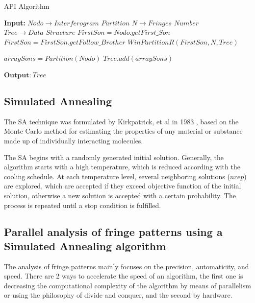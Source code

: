 \documentclass[review]{elsarticle}
\begin{document}
 \begin{algorithm}[H]
	\caption{API Algorithm}\label{IPA}
	\begin{algorithmic}[1]
		\State \textbf{Input:}
		\State $Nodo \to \textit{Interferogram Partition}$
		\State $N \to \textit{Fringes Number}$
		\State $Tree \to \textit{Data Structure}$
		\State $FirstSon = Nodo.getFirst\_Son$
		\State $FirstSon = FirstSon.getFollow\_Brother$
		\State $WinPartitionR(FirstSon, N, Tree)$
		\EndWhile
		
		\State $arraySons = Partition(Nodo)$
		\State $Tree.add(arraySons)$
		\EndIf
		\EndIf
		\EndIf
		
		\State $\textbf{Output:}\ Tree$	
		\EndProcedure
	\end{algorithmic}
\end{algorithm}
\subsection{Simulated Annealing}

The SA technique was formulated by Kirkpatrick, et al in 1983 \cite{metropolis1953,Kirkpatrick1983}, based on the Monte Carlo method for estimating the properties of any material or substance made up of individually interacting molecules.

The SA begins with a randomly generated  initial solution. Generally, the algorithm starts with a high temperature, which is reduced according with the cooling schedule. At each temperature level, several neighboring solutions ($nrep$) are explored, which are accepted if they exceed objective function of the initial solution, otherwise  a new solution is accepted with a certain probability. The process is repeated until a stop condition is fulfilled.

\subsection{Parallel analysis of fringe patterns using a Simulated Annealing  algorithm}

The analysis of fringe patterns mainly focuses on the precision, automaticity, and speed. There are 2 ways to accelerate the speed of an algorithm, the first one is decreasing the computational complexity of the algorithm by means of parallelism or using the philosophy of divide and conquer, and the second by hardware.
\end{document}
